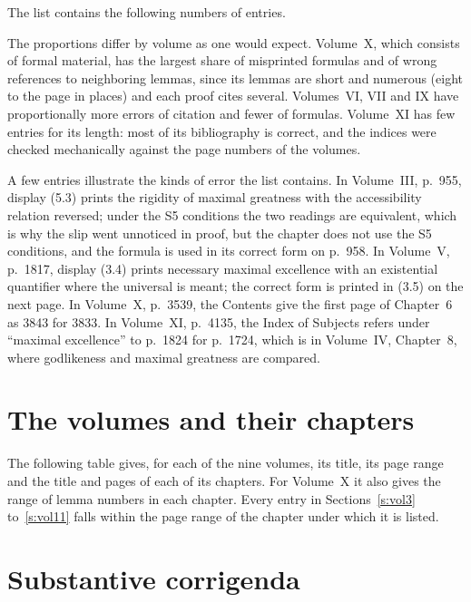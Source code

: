 \documentclass{situationist-preprint}
\begin{document}
The list contains the following numbers of entries.

\begin{center}\small

\end{center}

The proportions differ by volume as one would expect. Volume~X, which consists of formal material, has the largest share of misprinted formulas and of wrong references to neighboring lemmas, since its lemmas are short and numerous (eight to the page in places) and each proof cites several. Volumes~VI, VII and IX have proportionally more errors of citation and fewer of formulas. Volume~XI has few entries for its length: most of its bibliography is correct, and the indices were checked mechanically against the page numbers of the volumes.

A few entries illustrate the kinds of error the list contains. In Volume~III, p.~955, display (5.3) prints the rigidity of maximal greatness with the accessibility relation reversed; under the S5 conditions the two readings are equivalent, which is why the slip went unnoticed in proof, but the chapter does not use the S5 conditions, and the formula is used in its correct form on p.~958. In Volume~V, p.~1817, display (3.4) prints necessary maximal excellence with an existential quantifier where the universal is meant; the correct form is printed in (3.5) on the next page. In Volume~X, p.~3539, the Contents give the first page of Chapter~6 as 3843 for 3833. In Volume~XI, p.~4135, the Index of Subjects refers under \enquote{maximal excellence} to p.~1824 for p.~1724, which is in Volume~IV, Chapter~8, where godlikeness and maximal greatness are compared.

\section{The volumes and their chapters}\label{s:volumes}

The following table gives, for each of the nine volumes, its title, its page range and the title and pages of each of its chapters. For Volume~X it also gives the range of lemma numbers in each chapter. Every entry in Sections~\ref{s:vol3} to~\ref{s:vol11} falls within the page range of the chapter under which it is listed.

\medskip


\section{Substantive corrigenda}\label{s:substantive}
\end{document}
